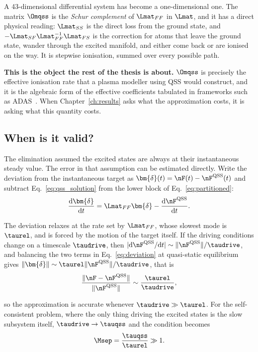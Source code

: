 A 43-dimensional differential system has become a one-dimensional one. The
matrix $\Omqss$ is the \emph{Schur complement} of $\Lmat_{FF}$ in $\Lmat$, and
it has a direct physical reading: $\Lmat_{SS}$ is the direct loss from the
ground state, and $-\Lmat_{SF}\Lmat_{FF}^{-1}\Lmat_{FS}$ is the correction for
atoms that leave the ground state, wander through the excited manifold, and
either come back or are ionised on the way. It is stepwise ionisation, summed
over every possible path.

\textbf{This is the object the rest of the thesis is about.} $\Omqss$ is
precisely the effective ionisation rate that a plasma modeller using QSS would
construct, and it is the algebraic form of the effective coefficients tabulated
in frameworks such as ADAS~\cite{Summers2006}. When
Chapter~\ref{ch:results} asks what the approximation costs, it is asking what
this quantity costs.

\subsection{When is it valid?}

The elimination assumed the excited states are always at their instantaneous
steady value. The error in that assumption can be estimated directly. Write the
deviation from the instantaneous target as
$\bm{\delta}(t) = \nF(t) - \nF^{\mathrm{QSS}}(t)$ and subtract
Eq.~\eqref{eq:qss_solution} from the lower block of Eq.~\eqref{eq:partitioned}:
\begin{equation}
  \frac{\mathrm{d}\bm{\delta}}{\mathrm{d}t}
  = \Lmat_{FF}\bm{\delta}
  - \frac{\mathrm{d}\nF^{\mathrm{QSS}}}{\mathrm{d}t}.
  \label{eq:deviation}
\end{equation}

The deviation relaxes at the rate set by $\Lmat_{FF}$, whose slowest mode is
$\taurel$, and is forced by the motion of the target itself. If the driving
conditions change on a timescale $\taudrive$, then
$|\mathrm{d}\nF^{\mathrm{QSS}}/\mathrm{d}t| \sim
\|\nF^{\mathrm{QSS}}\|/\taudrive$, and balancing the two terms in
Eq.~\eqref{eq:deviation} at quasi-static equilibrium gives
$\|\bm{\delta}\| \sim \taurel\|\nF^{\mathrm{QSS}}\|/\taudrive$, that is
\begin{equation}
  \frac{\|\nF - \nF^{\mathrm{QSS}}\|}{\|\nF^{\mathrm{QSS}}\|}
  \sim \frac{\taurel}{\taudrive},
  \label{eq:qss_validity}
\end{equation}

\noindent so the approximation is accurate whenever $\taudrive \gg \taurel$. For
the self-consistent problem, where the only thing driving the excited states is
the slow subsystem itself, $\taudrive \to \tauqss$ and the condition becomes
\begin{equation}
  \Msep = \frac{\tauqss}{\taurel} \gg 1 .
  \label{eq:qss_condition}
\end{equation}

